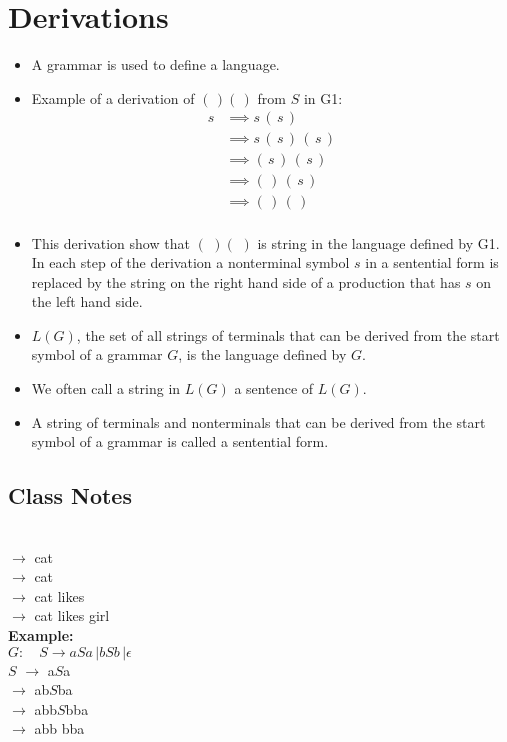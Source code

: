\documentclass[]{article}
\begin{document}
\section{Derivations}
  \begin{itemize}
    \item A grammar is used to define a language.
    \item Example of a derivation of $(\,)(\,)$ from $S$ in G1:
      \begin{align*}
        s & \implies s \, (\,s\,)            \\
          & \implies s \, (\,s\,) \, (\,s\,) \\
          & \implies      (\,s\,) \, (\,s\,) \\
          & \implies      (\,   ) \, (\,s\,) \\
          & \implies      (\,   ) \, (\,   ) \\ 
      \end{align*}
    \item This derivation show that $(\,\,)(\,\,)$ is string in the language
    defined by G1. In each step of the derivation a nonterminal symbol $s$ in a
    sentential form is replaced by the string on the right hand side of a 
    production that has $s$ on the left hand side.
    \item $L(G)$, the set of all strings of terminals that can be derived from
    the start symbol of a grammar $G$, is the language defined by $G$.
    \item We often call a string in $L(G)$ a sentence of $L(G)$.
    \item A string of terminals and nonterminals that can be derived from the 
    start symbol of a grammar is called a sentential form.
  \end{itemize}
  \subsection*{Class Notes}
     \\
    $\rightarrow$ cat                    \\
    $\rightarrow$ cat          \\
    $\rightarrow$ cat likes       \\
    $\rightarrow$ cat likes girl                   \\
    \textbf{Example:} \\
    $G: \quad S \rightarrow aSa \, | bSb \, | \epsilon$ \\
    $S$ $\rightarrow$ a$S$a     \\
        $\rightarrow$ ab$S$ba   \\
        $\rightarrow$ abb$S$bba \\
        $\rightarrow$ abb bba   \\ \\
        
\end{document}
